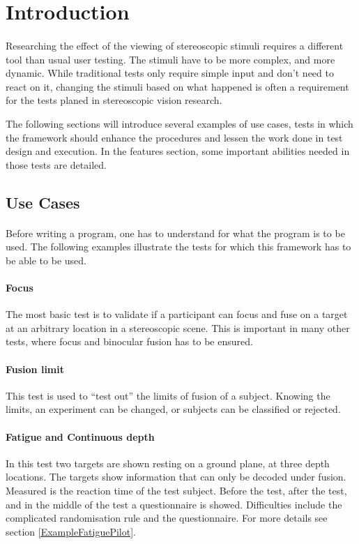 \section{Introduction\label{Introduction}}
\paragraph{}
Researching the effect of the viewing of stereoscopic stimuli requires a different tool than usual user testing. The stimuli have to be more complex, and more dynamic. While traditional tests only require simple input and don't need to react on it, changing the stimuli based on what happened is often a requirement for the tests planed in stereoscopic vision research.

The following sections will introduce several examples of use cases, tests in which the framework should enhance the procedures and lessen the work done in test design and execution.
In the features section, some important abilities needed in those tests are detailed.

\subsection{Use Cases}
\paragraph{}
Before writing a program, one has to understand for what the program is to be used. The following examples illustrate the tests for which this framework has to be able to be used.

\paragraph{Focus}
The most basic test is to validate if a participant can focus and fuse on a target at an arbitrary location in a stereoscopic scene.
This is important in many other tests, where focus and binocular fusion has to be ensured.

\paragraph{Fusion limit}
This test is used to ``test out'' the limits of fusion of a subject.
Knowing the limits, an experiment can be changed, or subjects can be classified or rejected.

\paragraph{Fatigue and Continuous depth}
In this test two targets are shown resting on a ground plane, at three depth locations.
The targets show information that can only be decoded under fusion.
Measured is the reaction time of the test subject.
Before the test, after the test, and in the middle of the test a questionnaire is showed.
Difficulties include the complicated randomisation rule and the questionnaire.
For more details see section \ref{ExampleFatiguePilot}.

